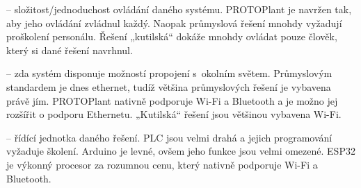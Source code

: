 \noindent{} -- složitost/jednoduchost ovládání daného systému.
PROTOPlant je navržen tak, aby jeho ovládání zvládnul každý.
Naopak průmyslová řešení mnohdy vyžadují proškolení personálu.
Řešení „kutilská“ dokáže mnohdy ovládat pouze člověk, který si dané řešení navrhnul. \newline

\noindent{} -- zda systém disponuje možností propojení s~okolním světem.
Průmyslovým standardem je dnes ethernet, tudíž většina průmyslových řešení je vybavena právě jím.
PROTOPlant nativně podporuje Wi-Fi a Bluetooth a je možno jej rozšířit o podporu Ethernetu.
„Kutilská“ řešení jsou většinou vybavena Wi-Fi. \newline

\noindent{} -- řídící jednotka daného řešení.
PLC jsou velmi drahá a jejich programování vyžaduje školení.
Arduino je levné, ovšem jeho funkce jsou velmi omezené.
ESP32 je výkonný procesor za rozumnou cenu, který nativně podporuje Wi-Fi a Bluetooth. \newline

\newpage
